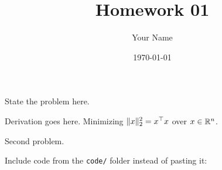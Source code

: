\documentclass[homework]{ituphd}
\title{Homework 01}
\author{Your Name}
\date{\today}
\begin{document}
\makecover

\begin{problem}
State the problem here.
\end{problem}
\begin{solution}
Derivation goes here. Minimizing $\lVert x\rVert_2^2 = x^{\top} x$ over $x\in\mathbb{R}^n$.

\begin{center}
\end{center}
\end{solution}

\begin{problem}
Second problem.
\end{problem}
\begin{solution}
Include code from the \texttt{code/} folder instead of pasting it:

\end{solution}
\end{document}
